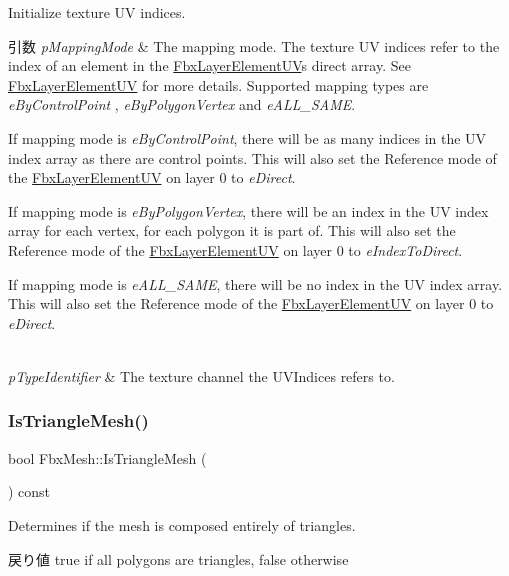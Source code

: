 Initialize texture UV indices. 
\begin{DoxyParams}{引数}
{\em p\+Mapping\+Mode} & The mapping mode. The texture UV indices refer to the index of an element in the \hyperlink{class_fbx_layer_element_u_v}{Fbx\+Layer\+Element\+UV}\textquotesingle{}s direct array. See \hyperlink{class_fbx_layer_element_u_v}{Fbx\+Layer\+Element\+UV} for more details. Supported mapping types are {\itshape e\+By\+Control\+Point} , {\itshape e\+By\+Polygon\+Vertex} and {\itshape e\+A\+L\+L\+\_\+\+S\+A\+ME}.
\begin{DoxyItemize}
\item If mapping mode is {\itshape e\+By\+Control\+Point}, there will be as many indices in the UV index array as there are control points. This will also set the Reference mode of the \hyperlink{class_fbx_layer_element_u_v}{Fbx\+Layer\+Element\+UV} on layer 0 to {\itshape e\+Direct}.
\item If mapping mode is {\itshape e\+By\+Polygon\+Vertex}, there will be an index in the UV index array for each vertex, for each polygon it is part of. This will also set the Reference mode of the \hyperlink{class_fbx_layer_element_u_v}{Fbx\+Layer\+Element\+UV} on layer 0 to {\itshape e\+Index\+To\+Direct}.
\item If mapping mode is {\itshape e\+A\+L\+L\+\_\+\+S\+A\+ME}, there will be no index in the UV index array. This will also set the Reference mode of the \hyperlink{class_fbx_layer_element_u_v}{Fbx\+Layer\+Element\+UV} on layer 0 to {\itshape e\+Direct}. 
\end{DoxyItemize}\\
\hline
{\em p\+Type\+Identifier} & The texture channel the U\+V\+Indices refers to. \\
\hline
\end{DoxyParams}
\mbox{\label{class_fbx_mesh_ac361286e901ffa6a3e651bf8ba71be26}} 
\subsubsection{\texorpdfstring{Is\+Triangle\+Mesh()}{IsTriangleMesh()}}
{\footnotesize\ttfamily bool Fbx\+Mesh\+::\+Is\+Triangle\+Mesh (\begin{DoxyParamCaption}{ }\end{DoxyParamCaption}) const}

Determines if the mesh is composed entirely of triangles. \begin{DoxyReturn}{戻り値}
true if all polygons are triangles, false otherwise 
\end{DoxyReturn}
\mbox{\label{class_fbx_mesh_a77960edb068c0323698bae275281f920}} 

